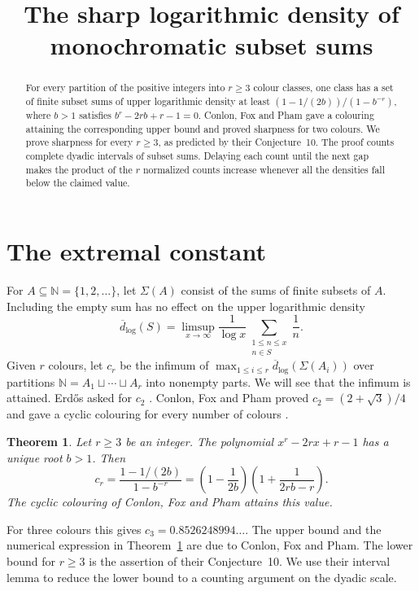 \documentclass[11pt]{article}
\title{The sharp logarithmic density of monochromatic subset sums}
\author{}
\date{}
\newtheorem{theorem}{Theorem}
\newcommand{\N}{\mathbb N}
\newcommand{\dd}{\overline d_{\log}}
\begin{document}
\maketitle
\begin{abstract}
For every partition of the positive integers into $r\ge3$ colour classes, one
class has a set of finite subset sums of upper logarithmic density at least
$(1-1/(2b))/(1-b^{-r})$, where $b>1$ satisfies
$b^r-2rb+r-1=0$. Conlon, Fox and Pham gave a colouring attaining the
corresponding upper bound and proved sharpness for two colours.
We prove sharpness for every $r\ge3$, as predicted by their Conjecture~10.
The proof counts complete dyadic intervals of subset sums.
Delaying each count until the next gap makes the product of the $r$
normalized counts increase whenever all the densities fall below the
claimed value.
\end{abstract}

\section{The extremal constant}

For $A\subseteq\N=\{1,2,\ldots\}$, let $\Sigma(A)$ consist of the sums of
finite subsets of $A$. Including the empty sum has no effect on the
upper logarithmic density
\[
 \dd(S)=\limsup_{x\to\infty}
  \frac1{\log x}\sum_{\substack{1\le n\le x\\n\in S}}\frac1n .
\]
Given $r$ colours, let $c_r$ be the infimum of
$\max_{1\le i\le r}\dd(\Sigma(A_i))$ over partitions
$\N=A_1\sqcup\cdots\sqcup A_r$ into nonempty parts. We will see that
the infimum is attained. Erd\H{o}s asked for $c_2$
\cite{erdos-mysore,erdos-misc}. Conlon, Fox and Pham proved
$c_2=(2+\sqrt3)/4$ and gave a cyclic colouring for every number of colours
\cite[Theorem~1]{cfp}.

\begin{theorem}\label{thm:main}
Let $r\ge3$ be an integer. The polynomial $x^r-2rx+r-1$ has a unique
root $b>1$. Then
\[
 c_r=\frac{1-1/(2b)}{1-b^{-r}}
     =\left(1-\frac1{2b}\right)\left(1+\frac1{2rb-r}\right).
\]
The cyclic colouring of Conlon, Fox and Pham attains this value.
\end{theorem}

For three colours this gives $c_3=0.8526248994\ldots$.
The upper bound and the numerical expression in
Theorem~\ref{thm:main} are due to Conlon, Fox and Pham. The lower bound
for $r\ge3$ is the assertion of their Conjecture~10.
We use their interval lemma to reduce the lower bound to a counting
argument on the dyadic scale.
\end{document}
